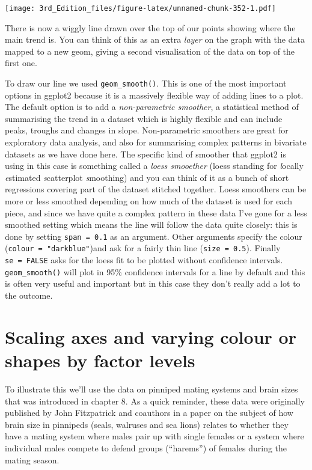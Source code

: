 \documentclass[
]{book}
\begin{document}
\texttt{[image: 3rd\_Edition\_files/figure-latex/unnamed-chunk-352-1.pdf]}

There is now a wiggly line drawn over the top of our points showing where the main trend is. You can think of this as an extra \emph{layer} on the graph with the data mapped to a new geom, giving a second visualisation of the data on top of the first one.

To draw our line we used \texttt{geom\_smooth()}. This is one of the most important options in ggplot2 because it is a massively flexible way of adding lines to a plot. The default option is to add a \emph{non-parametric smoother}, a statistical method of summarising the trend in a dataset which is highly flexible and can include peaks, troughs and changes in slope. Non-parametric smoothers are great for exploratory data analysis, and also for summarising complex patterns in bivariate datasets as we have done here. The specific kind of smoother that ggplot2 is using in this case is something called a \emph{loess smooether} (loess standing for \emph{l}ocally \emph{e}stimated \emph{s}catterplot \emph{s}moothing) and you can think of it as a bunch of short regressions covering part of the dataset stitched together. Loess smoothers can be more or less smoothed depending on how much of the dataset is used for each piece, and since we have quite a complex pattern in these data I've gone for a less smoothed setting which means the line will follow the data quite closely: this is done by setting \texttt{span\ =\ 0.1} as an argument. Other arguments specify the colour (\texttt{colour\ =\ "darkblue"})and ask for a fairly thin line (\texttt{size\ =\ 0.5}). Finally \texttt{se\ =\ FALSE} asks for the loess fit to be plotted without confidence intervals. \texttt{geom\_smooth()} will plot in 95\% confidence intervals for a line by default and this is often very useful and important but in this case they don't really add a lot to the outcome.

\hypertarget{scaling-axes-and-varying-colour-or-shapes-by-factor-levels}{%
\section{Scaling axes and varying colour or shapes by factor levels}\label{scaling-axes-and-varying-colour-or-shapes-by-factor-levels}}

To illustrate this we'll use the data on pinniped mating systems and brain sizes that was introduced in chapter 8. As a quick reminder, these data were originally published by John Fitzpatrick and coauthors in a paper on the subject of how brain size in pinnipeds (seals, walruses and sea lions) relates to whether they have a mating system where males pair up with single females or a system where individual males compete to defend groups (``harems'') of females during the mating season.
\end{document}
